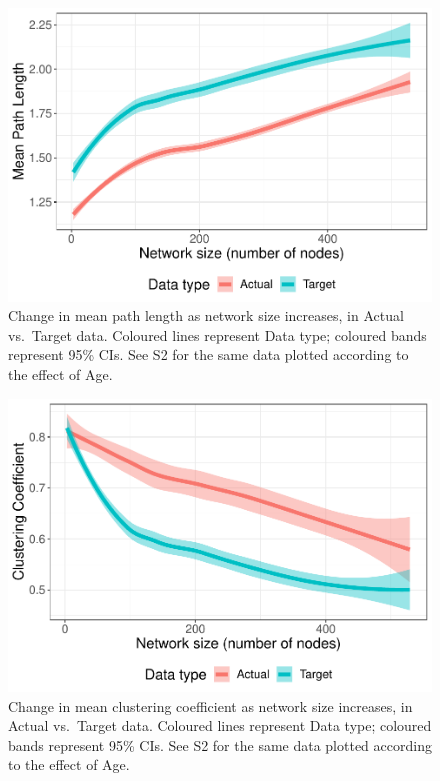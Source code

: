 \documentclass[
  man]{apa6}
\begin{document}
\begin{figure}
\centering
\includegraphics{NetworkGraphs_files/figure-latex/Figure-path-length-DT-1.pdf}
\caption{\label{fig:Figure-path-length-DT}Change in mean path length as network size increases, in Actual vs.~Target data. Coloured lines represent Data type; coloured bands represent 95\% CIs. See S2 for the same data plotted according to the effect of Age.}
\end{figure}

\begin{figure}
\centering
\includegraphics{NetworkGraphs_files/figure-latex/Figure-clust-coef-DT-1.pdf}
\caption{\label{fig:Figure-clust-coef-DT}Change in mean clustering coefficient as network size increases, in Actual vs.~Target data. Coloured lines represent Data type; coloured bands represent 95\% CIs. See S2 for the same data plotted according to the effect of Age.}
\end{figure}
\end{document}
